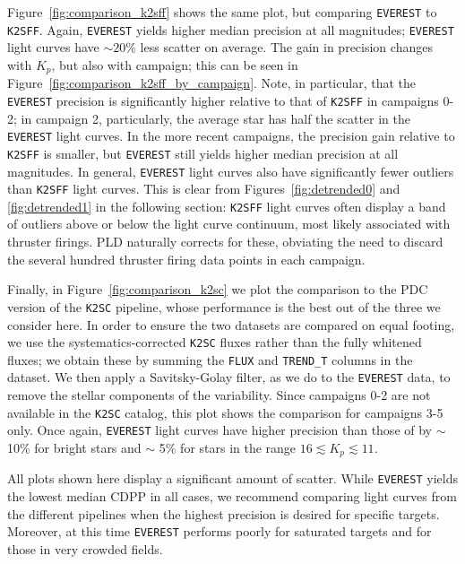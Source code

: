 \documentclass[]{emulateapj}
\begin{document}
Figure~\ref{fig:comparison_k2sff} shows the same plot, but comparing \texttt{EVEREST} to
\texttt{K2SFF}. Again, \texttt{EVEREST} yields higher median precision at all
magnitudes; \texttt{EVEREST} light curves have $\sim 20\%$ less scatter on average. The
gain in precision changes with $K_p$, but also with campaign; this can be seen in 
Figure~\ref{fig:comparison_k2sff_by_campaign}. Note, in particular, that the \texttt{EVEREST}
precision is significantly higher relative to that of \texttt{K2SFF} in campaigns 0-2;
in campaign 2, particularly, the average star has half the scatter in the \texttt{EVEREST}
light curves. In the more recent campaigns, the precision gain relative to \texttt{K2SFF}
is smaller, but \texttt{EVEREST} still yields higher median precision at all magnitudes.
In general, \texttt{EVEREST} light curves also have significantly fewer outliers than \texttt{K2SFF} light curves.
This is clear from Figures~\ref{fig:detrended0} and \ref{fig:detrended1} in the
following section: \texttt{K2SFF} light curves often display a band of outliers
above or below the light curve continuum, most likely associated with thruster firings. PLD
naturally corrects for these, obviating the need to discard the several hundred thruster
firing data points in each campaign.

Finally, in Figure~\ref{fig:comparison_k2sc} we plot the comparison to the PDC version
of the \texttt{K2SC}
pipeline, whose performance is the best out of the three we consider here. In order to 
ensure the two datasets are compared on equal footing, we use the systematics-corrected
\texttt{K2SC} fluxes rather than the fully whitened fluxes; we obtain these by
summing the \texttt{FLUX} and \texttt{TREND\_T} columns in the dataset. We then apply
a Savitsky-Golay filter, as we do to the \texttt{EVEREST} data, to remove the stellar 
components of the variability. Since campaigns 0-2 are not available in the \texttt{K2SC}
catalog, this plot shows the comparison for campaigns 3-5 only.
Once again, \texttt{EVEREST} light curves have higher precision than those of
 by $\sim$ 10\% for bright stars and $\sim$ 5\% for stars in the range
$16 \lesssim K_p \lesssim 11$.

All plots shown here display a significant amount of scatter. While \texttt{EVEREST}
yields the lowest median CDPP in all cases, we recommend comparing light curves from
the different pipelines when the highest precision is desired for specific targets.
Moreover, at this time \texttt{EVEREST} performs poorly for saturated
targets and for those in very crowded fields.
\end{document}
